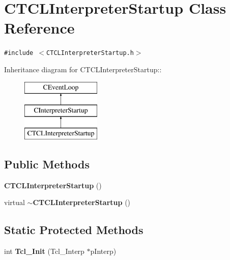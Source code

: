 \section{CTCLInterpreter\-Startup  Class Reference}
\label{classCTCLInterpreterStartup}
{\tt \#include $<$CTCLInterpreter\-Startup.h$>$}

Inheritance diagram for CTCLInterpreter\-Startup::\begin{figure}[H]
\begin{center}
\leavevmode
\includegraphics[height=3cm]{classCTCLInterpreterStartup}
\end{center}
\end{figure}
\subsection*{Public Methods}
\begin{CompactItemize}
\item 
{\bf CTCLInterpreter\-Startup} ()
\item 
virtual {\bf $\sim$CTCLInterpreter\-Startup} ()
\end{CompactItemize}
\subsection*{Static Protected Methods}
\begin{CompactItemize}
\item 
int {\bf Tcl\_\-Init} (Tcl\_\-Interp $\ast$p\-Interp)
\end{CompactItemize}
